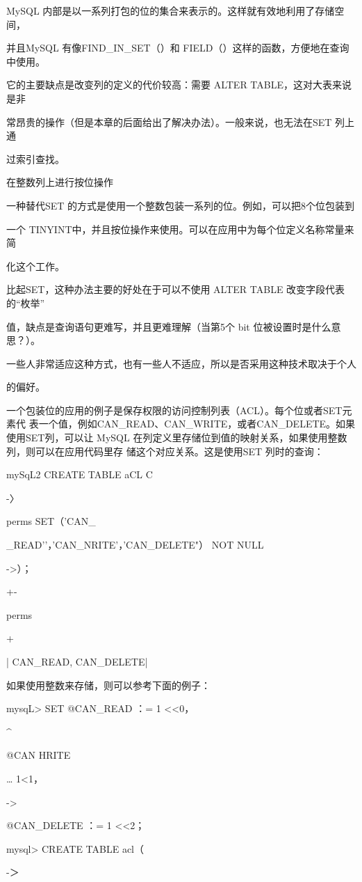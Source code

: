 MySQL 内部是以一系列打包的位的集合来表示的。这样就有效地利用了存储空间，

并且MySQL 有像FIND\_IN\_SET（）和 FIELD（）这样的函数，方便地在查询中使用。

它的主要缺点是改变列的定义的代价较高：需要 ALTER TABLE，这对大表来说是非

常昂贵的操作（但是本章的后面给出了解决办法）。一般来说，也无法在SET 列上通

过索引查找。

在整数列上进行按位操作

一种替代SET 的方式是使用一个整数包装一系列的位。例如，可以把8个位包装到

一个 TINYINT中，并且按位操作来使用。可以在应用中为每个位定义名称常量来简

化这个工作。

比起SET，这种办法主要的好处在于可以不使用 ALTER TABLE 改变字段代表的“枚举”

值，缺点是查询语句更难写，并且更难理解（当第5个 bit 位被设置时是什么意思？）。

一些人非常适应这种方式，也有一些人不适应，所以是否采用这种技术取决于个人

的偏好。

一个包装位的应用的例子是保存权限的访问控制列表（ACL）。每个位或者SET元素代
表一个值，例如CAN\_READ、CAN\_WRITE，或者CAN\_DELETE。如果使用SET列，可以让
MySQL 在列定义里存储位到值的映射关系，如果使用整数列，则可以在应用代码里存
储这个对应关系。这是使用SET 列时的查询：

mySqL2 CREATE TABLE aCL C

-〉

perms SET（'CAN\_

\_READ’'，'CAN\_NRITE'，'CAN\_DELETE"） NOT NULL

->）；

+-

perms

+

| CAN\_READ, CAN\_DELETE|

如果使用整数来存储，则可以参考下面的例子：

mysqL> SET @CAN\_READ ：= 1 <<0，

^

@CAN HRITE

… 1<1，

->

@CAN\_DELETE ：= 1 <<2；

mysql> CREATE TABLE acl（

-＞

